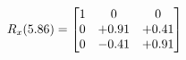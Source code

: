 \documentclass[preview]{standalone}
\begin{document}
\begin{align*}
\special{dvisvgm:raw <g id='unique000'>}R_{x}(5.86) = \begin{bmatrix}1 & 0 & 0 \\0 & +0.91 & +0.41 \\0 & -0.41 & +0.91\end{bmatrix}\special{dvisvgm:raw </g>}
\end{align*}
\end{document}
